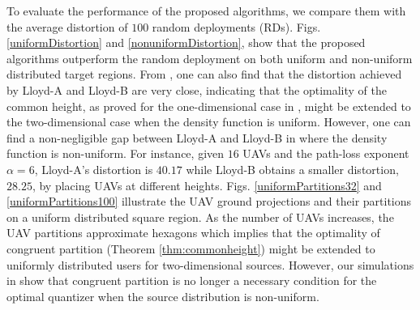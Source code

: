 \documentclass[12pt,onecolumn,journal,draftclsnofoot,letterpaper]{IEEEtran}
\newif\ifarxiv\arxivfalse
\begin{document}
To evaluate the performance of the proposed algorithms, we compare them with the average distortion of $100$ random
deployments (RDs).  Figs. \ref{uniformDistortion} and \ref{nonuniformDistortion}, show that the proposed algorithms
outperform the random deployment on both uniform and non-uniform distributed target regions.  From
, one can also find that the distortion achieved by Lloyd-A and Lloyd-B are very close,
indicating that the optimality of the common height, as proved for the one-dimensional case in ,
might be extended to the two-dimensional case when the density function is uniform. However, one can find a
non-negligible gap between Lloyd-A and Lloyd-B in  where the density function is
non-uniform. For instance, given $16$ UAVs and the path-loss exponent $\alpha=6$, Lloyd-A's distortion is $40.17$ while
Lloyd-B obtains a smaller distortion, $28.25$, by placing UAVs at different heights.  
%
Figs. \ref{uniformPartitions32} and \ref{uniformPartitions100} illustrate the UAV ground projections and their
partitions on a uniform distributed square region. As the number of UAVs increases, the UAV partitions approximate
hexagons which implies that the optimality of congruent partition (Theorem \ref{thm:commonheight}) might be extended to
uniformly distributed users for two-dimensional sources.  \ifarxiv However, the UAV projections in Figs.
\ref{nonuniformPartitions32} and \ref{nonuniformPartitions100} show that congruent partition is no longer a necessary
condition for the optimal quantizer when distribution is non-uniform. \else   However, our simulations in \cite{GWJ18b}
show that congruent partition is no longer a necessary condition for the optimal quantizer when the source distribution
is non-uniform.  \fi
%
\end{document}
